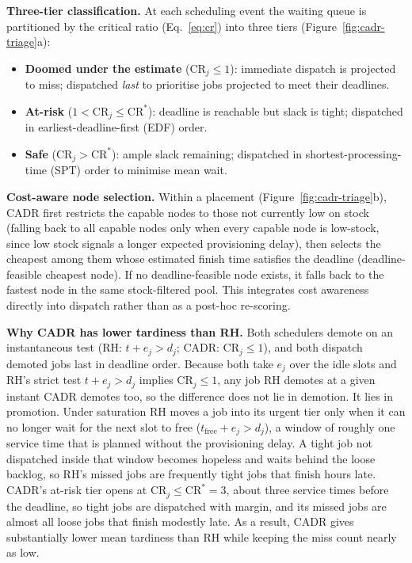 \textbf{Three-tier classification.} At each scheduling event the waiting queue is partitioned by the critical ratio (Eq.~\ref{eq:cr}) into three tiers (Figure~\ref{fig:cadr-triage}a):
\begin{itemize}
  \item \textbf{Doomed under the estimate} ($\mathrm{CR}_j \leq 1$): immediate dispatch is projected to miss; dispatched \emph{last} to prioritise jobs projected to meet their deadlines.
  \item \textbf{At-risk} ($1 < \mathrm{CR}_j \leq \mathrm{CR}^*$): deadline is reachable but slack is tight; dispatched in earliest-deadline-first (EDF) order.
  \item \textbf{Safe} ($\mathrm{CR}_j > \mathrm{CR}^*$): ample slack remaining; dispatched in shortest-processing-time (SPT) order to minimise mean wait.
\end{itemize}

\textbf{Cost-aware node selection.} Within a placement (Figure~\ref{fig:cadr-triage}b), CADR first restricts the capable nodes to those not currently low on stock (falling back to all capable nodes only when every capable node is low-stock, since low stock signals a longer expected provisioning delay), then selects the cheapest among them whose estimated finish time satisfies the deadline (deadline-feasible cheapest node). If no deadline-feasible node exists, it falls back to the fastest node in the same stock-filtered pool. This integrates cost awareness directly into dispatch rather than as a post-hoc re-scoring.



\textbf{Why CADR has lower tardiness than RH.} Both schedulers demote on an instantaneous test (RH: $t + e_j > d_j$; CADR: $\mathrm{CR}_j \leq 1$), and both dispatch demoted jobs last in deadline order. Because both take $e_j$ over the idle slots and RH's strict test $t + e_j > d_j$ implies $\mathrm{CR}_j \leq 1$, any job RH demotes at a given instant CADR demotes too, so the difference does not lie in demotion. It lies in promotion. Under saturation RH moves a job into its urgent tier only when it can no longer wait for the next slot to free ($t_{\text{free}} + e_j > d_j$), a window of roughly one service time that is planned without the provisioning delay. A tight job not dispatched inside that window becomes hopeless and waits behind the loose backlog, so RH's missed jobs are frequently tight jobs that finish hours late. CADR's at-risk tier opens at $\mathrm{CR}_j \leq \mathrm{CR}^* = 3$, about three service times before the deadline, so tight jobs are dispatched with margin, and its missed jobs are almost all loose jobs that finish modestly late. As a result, CADR gives substantially lower mean tardiness than RH while keeping the miss count nearly as low.

